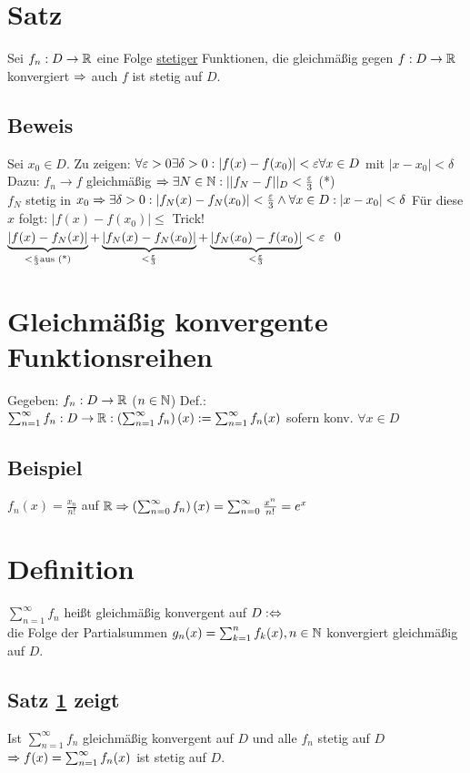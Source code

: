 \section{Satz}\label{13.4}
Sei $f_n: D \to \mathbb{R}$ eine Folge \underline{stetiger} Funktionen, die gleichmäßig gegen $f: D \to \mathbb{R}$ konvergiert $\Rightarrow$ auch $f$ ist stetig auf $D$.

\subsection*{Beweis}
Sei $x_0 \in D$. Zu zeigen: $\forall \varepsilon > 0 \exists \delta > 0: |f(x)-f(x_0)| < \varepsilon \forall x \in D$ mit $|x-x_0| < \delta$\\
Dazu: $f_n \to f$ gleichmäßig $\Rightarrow \exists N \in \mathbb{N}: ||f_N-f||_D < \frac{\varepsilon}{3}$ (*)\\
$f_N$ stetig in $x_0 \Rightarrow \exists \delta > 0: |f_N(x)-f_N(x_0)| < \frac{\varepsilon}{3} \wedge \forall x \in D: |x-x_0| < \delta$\nl
Für diese $x$ folgt: $|f(x)-f(x_0)| \le$ Trick!\\
$\underbrace{|f(x)-f_N(x)|}_{< \frac{\varepsilon}{3} \text{aus (*)}} + \underbrace{|f_N(x)-f_N(x_0)|}_{< \frac{\varepsilon}{3}} + \underbrace{|f_N(x_0)-f(x_0)|}_{< \frac{\varepsilon}{3}} < \varepsilon$ \qed

\newpage

\section*{Gleichmäßig konvergente Funktionsreihen}
Gegeben: $f_n: D \to \mathbb{R}$ ($n \in \mathbb{N}$)
Def.: $\sum_{n=1}^\infty f_n: D \to \mathbb{R}: \left(\sum_{n=1}^\infty f_n\right)(x) := \sum_{n=1}^\infty f_n(x)$ sofern konv. $\forall x \in D$

\subsection*{Beispiel}
$f_n(x) = \frac{x_n}{n!}$ auf $\mathbb{R} \Rightarrow \left(\sum_{n=0}^\infty f_n\right)(x) = \sum_{n=0}^\infty \frac{x^n}{n!} = e^x$

\section{Definition}\label{13.5}
$\sum_{n=1}^\infty f_n$ heißt gleichmäßig konvergent auf $D :\Leftrightarrow$\\
die Folge der Partialsummen $g_n(x) = \sum_{k=1}^n f_k(x), n \in \mathbb{N}$ konvergiert gleichmäßig auf $D$.

\subsection*{Satz \ref{13.4} zeigt}
Ist $\sum_{n=1}^\infty f_n$ gleichmäßig konvergent auf $D$ und alle $f_n$ stetig auf $D$\\
$\Rightarrow f(x)=\sum_{n=1}^\infty f_n(x)$ ist stetig auf $D$.

